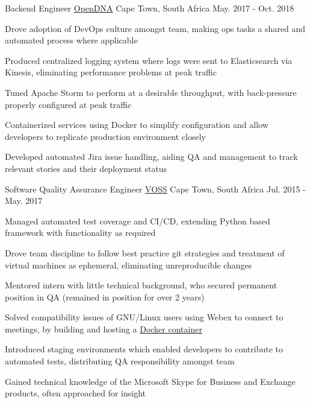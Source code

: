 \begin{cventries}
  \cventry
    {Backend Engineer} %
    {\href{https://opendna.ai}{OpenDNA}} %
    {Cape Town, South Africa} %
    {May. 2017 - Oct. 2018} %
    {
      \begin{cvitems} %
        \item {Drove adoption of DevOps culture amongst team, making ops tasks a shared and automated process where applicable}
        \item {Produced centralized logging system where logs were sent to Elasticsearch via Kinesis, eliminating performance problems at peak traffic}
        \item {Tuned Apache Storm to perform at a desirable throughput, with back-pressure properly configured at peak traffic}
        \item {Containerized services using Docker to simplify configuration and allow developers to replicate production environment closely}
        \item {Developed automated Jira issue handling, aiding QA and management to track relevant stories and their deployment status}
      \end{cvitems}
    }

  \cventry
    {Software Quality Assurance Engineer} %
    {\href{https://www.voss-solutions.com}{VOSS}} %
    {Cape Town, South Africa} %
    {Jul. 2015 - May. 2017} %
    {
      \begin{cvitems} %
        \item {Managed automated test coverage and CI/CD, extending Python based framework with functionality as required}
        \item {Drove team discipline to follow best practice git strategies and treatment of virtual machines as ephemeral, eliminating unreproducible changes}
        \item {Mentored intern with little technical background, who secured permanent position in QA (remained in position for over 2 years)}
        \item {Solved compatibility issues of GNU/Linux users using Webex to connect to meetings, by building and hosting a \href{https://hub.docker.com/r/dnk8n/docker-webex}{Docker container}}
        \item {Introduced staging environments which enabled developers to contribute to automated tests, distributing QA responsibility amongst team}
        \item {Gained technical knowledge of the Microsoft Skype for Business and Exchange products, often approached for insight}
      \end{cvitems}
    }


\end{cventries}
